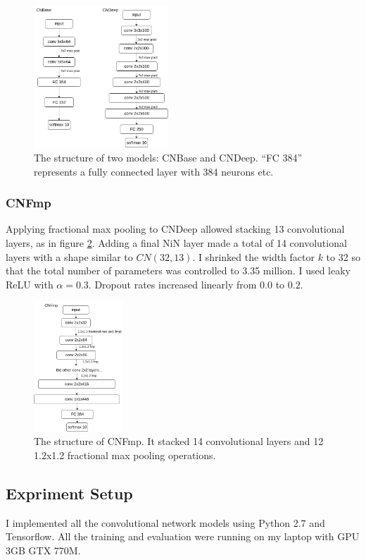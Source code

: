 \documentclass[conference]{IEEEtran}
\begin{document}
\begin{figure}[htbp]
\centerline{\includegraphics[width=0.45\textwidth]{models.png}}
\caption{The structure of two models: CNBase and CNDeep. ``FC 384'' represents a fully connected layer with 384 neurons etc.}
\label{fig1}
\end{figure}

\subsubsection*{CNFmp}
Applying fractional max pooling \cite{fmp} to CNDeep allowed stacking 13 convolutional layers, as in figure \ref{fig2}. Adding a final NiN layer made a total of 14 convolutional layers with a shape similar to $CN(32, 13)$. I shrinked the width factor $k$ to 32 so that the total number of parameters was controlled to 3.35 million. I used leaky ReLU with $\alpha=0.3$. Dropout rates increased linearly from $0.0$ to $0.2$.

\begin{figure}[htbp]
\centerline{\includegraphics[width=0.3\textwidth]{fmp_model.png}}
\caption{The structure of CNFmp. It stacked 14 convolutional layers and 12 1.2x1.2 fractional max pooling operations.}
\label{fig2}
\end{figure}

\subsection*{Expriment Setup}
I implemented all the convolutional network models using Python 2.7 and Tensorflow. All the training and evaluation were running on my laptop with GPU 3GB GTX 770M.
\end{document}
